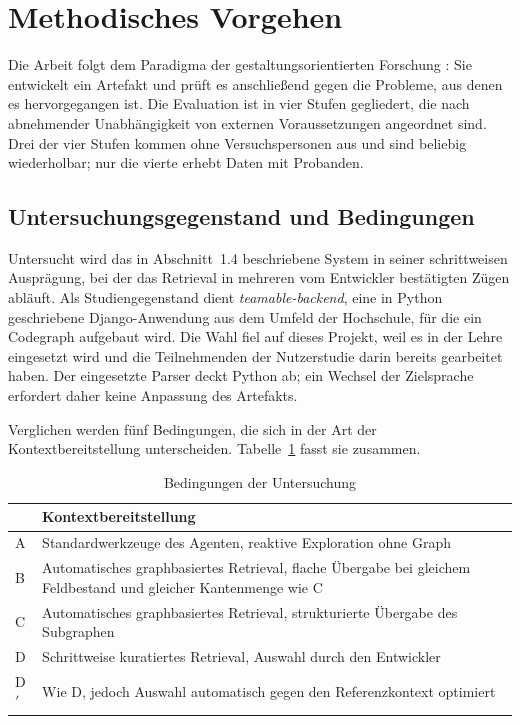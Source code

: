 
\section{Methodisches Vorgehen}
\label{sec:methodik}

Die Arbeit folgt dem Paradigma der gestaltungsorientierten Forschung \parencite{hevner2004dsr}: Sie entwickelt ein Artefakt und prüft es anschließend gegen die Probleme, aus denen es hervorgegangen ist. Die Evaluation ist in vier Stufen gegliedert, die nach abnehmender Unabhängigkeit von externen Voraussetzungen angeordnet sind. Drei der vier Stufen kommen ohne Versuchspersonen aus und sind beliebig wiederholbar; nur die vierte erhebt Daten mit Probanden.

\subsection{Untersuchungsgegenstand und Bedingungen}
\label{subsec:bedingungen}

Untersucht wird das in Abschnitt~1.4 beschriebene System in seiner schrittweisen Ausprägung, bei der das Retrieval in mehreren vom Entwickler bestätigten Zügen abläuft. Als Studiengegenstand dient \textit{teamable-backend}, eine in Python geschriebene Django-Anwendung aus dem Umfeld der Hochschule, für die ein Codegraph aufgebaut wird. Die Wahl fiel auf dieses Projekt, weil es in der Lehre eingesetzt wird und die Teilnehmenden der Nutzerstudie darin bereits gearbeitet haben. Der eingesetzte Parser deckt Python ab; ein Wechsel der Zielsprache erfordert daher keine Anpassung des Artefakts.

Verglichen werden fünf Bedingungen, die sich in der Art der Kontextbereitstellung unterscheiden. Tabelle~\ref{tab:bedingungen} fasst sie zusammen.

\begin{table}[htbp]
  \centering
  \small
  \begin{tabularx}{\textwidth}{@{}lX@{}}
    \toprule
    & Kontextbereitstellung \\
    \midrule
    A & Standardwerkzeuge des Agenten, reaktive Exploration ohne Graph \\
    B & Automatisches graphbasiertes Retrieval, flache Übergabe bei gleichem Feldbestand und gleicher Kantenmenge wie C \\
    C & Automatisches graphbasiertes Retrieval, strukturierte Übergabe des Subgraphen \\
    D & Schrittweise kuratiertes Retrieval, Auswahl durch den Entwickler \\
    D$'$ & Wie D, jedoch Auswahl automatisch gegen den Referenzkontext optimiert \\
    \bottomrule
  \end{tabularx}
  \caption{Bedingungen der Untersuchung}
  \label{tab:bedingungen}
\end{table}

